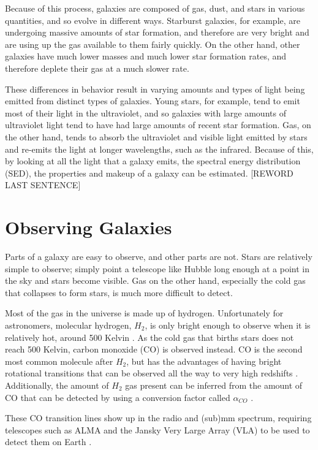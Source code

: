 \documentclass[twoside,single]{lion-msc}
\begin{document}
Because of this process, galaxies are composed of gas, dust, and stars in various quantities, and so evolve in different ways. Starburst galaxies, for example, are undergoing massive amounts of star formation, and therefore are very bright and are using up the gas available to them fairly quickly. On the other hand, other galaxies have much lower masses and much lower star formation rates, and therefore deplete their gas at a much slower rate. 

These differences in behavior result in varying amounts and types of light being emitted from distinct types of galaxies. Young stars, for example, tend to emit most of their light in the ultraviolet, and so galaxies with large amounts of ultraviolet light tend to have had large amounts of recent star formation. Gas, on the other hand, tends to absorb the ultraviolet and visible light emitted by stars and re-emits the light at longer wavelengths, such as the infrared. Because of this, by looking at all the light that a galaxy emits, the spectral energy distribution (SED), the properties and makeup of a galaxy can be estimated. [REWORD LAST SENTENCE]

\section{Observing Galaxies}

Parts of a galaxy are easy to observe, and other parts are not. Stars are relatively simple to observe; simply point a telescope like Hubble long enough at a point in the sky and stars become visible. Gas on the other hand, especially the cold gas that collapses to form stars, is much more difficult to detect.

Most of the gas in the universe is made up of hydrogen. Unfortunately for astronomers, molecular hydrogen, $H_2$, is only bright enough to observe when it is relatively hot, around 500 Kelvin \cite{decarli2019alma}. As the cold gas that births stars does not reach 500 Kelvin, carbon monoxide (CO) is observed instead. CO is the second most common molecule after $H_2$, but has the advantages of having bright rotational transitions that can be observed all the way to very high redshifts \cite{walter2016alma, decarli2019alma}. Additionally, the amount of $H_2$ gas present can be inferred from the amount of CO that can be detected by using a conversion factor called $\alpha_{CO}$ \cite{decarli2019alma}. 

These CO transition lines show up in the radio and (sub)mm spectrum, requiring telescopes such as ALMA and the Jansky Very Large Array (VLA) to be used to detect them on Earth \cite{decarli2019alma}. 
\end{document}
